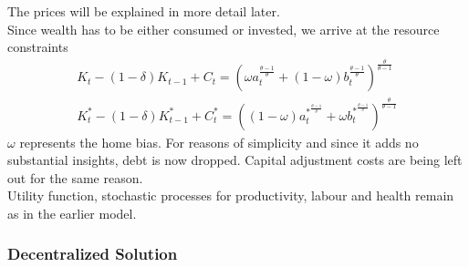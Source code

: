 \documentclass{article}
\begin{document}
The prices will be explained in more detail later.\\
Since wealth has to be either consumed or invested, we arrive at the resource constraints
\begin{align}
K_t - (1-\delta)K_{t-1} + C_t = (\omega a_t^{\frac{\theta-1}{\theta}} + (1-\omega) b_t^{\frac{\theta-1}{\theta}})^{\frac{\theta}{\theta-1}} \\
K_t^* - (1-\delta)K_{t-1}^* + C^*_t= ((1-\omega) a_t^{*^{\frac{\theta-1}{\theta}}} + \omega b_t^{*^{\frac{\theta-1}{\theta}}})^{\frac{\theta}{\theta-1}}
\end{align}
$\omega$ represents the home bias. For reasons of simplicity and since it adds no substantial insights, debt is now dropped. Capital adjustment costs are being left out for the same reason.\\
Utility function, stochastic processes for productivity, labour and health remain as in the earlier model.

\subsubsection{Decentralized Solution}
\end{document}
